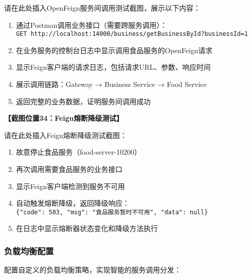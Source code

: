 \documentclass[a4paper,12pt]{article}
\begin{document}
请在此处插入OpenFeign服务间调用测试截图，展示以下内容：
\begin{enumerate}
\item 通过Postman调用业务接口（需要跨服务调用）：\\
  \texttt{GET http://localhost:14000/business/getBusinessById?businessId=1}
\item 在业务服务的控制台日志中显示调用食品服务的OpenFeign请求
\item 显示Feign客户端的请求日志，包括请求URL、参数、响应时间
\item 展示调用链路：Gateway → Business Service → Food Service
\item 返回完整的业务数据，证明服务间调用成功
\end{enumerate}

\textbf{【截图位置34：Feign熔断降级测试】}

请在此处插入Feign熔断降级测试截图：
\begin{enumerate}
\item 故意停止食品服务（food-server-10200）
\item 再次调用需要食品服务的业务接口
\item 显示Feign客户端检测到服务不可用
\item 自动触发熔断降级，返回降级响应：\\
  \texttt{\{"code": 503, "msg": "食品服务暂时不可用", "data": null\}}
\item 在日志中显示熔断器状态变化和降级方法执行
\end{enumerate}

\subsubsection{负载均衡配置}

配置自定义的负载均衡策略，实现智能的服务调用分发：
\end{document}
